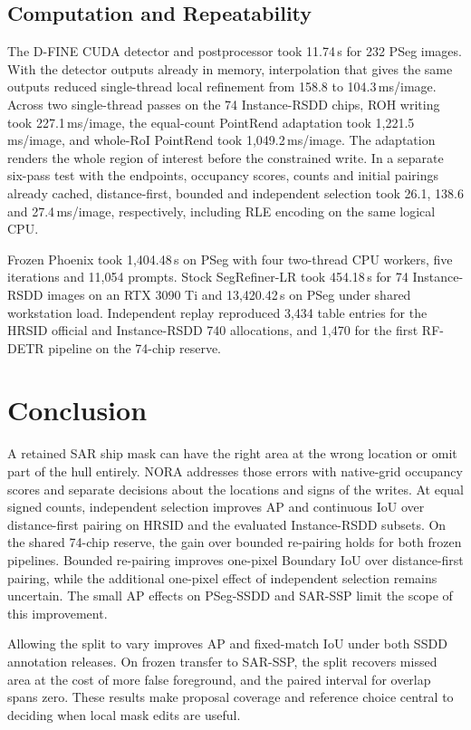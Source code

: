 \documentclass[journal]{IEEEtran}
\begin{document}
\subsection{Computation and Repeatability}
The D-FINE CUDA detector and postprocessor took 11.74\,s for 232 PSeg images. With the detector outputs already in memory, interpolation that gives the same outputs reduced single-thread local refinement from 158.8 to 104.3\,ms/image. Across two single-thread passes on the 74 Instance-RSDD chips, ROH writing took 227.1\,ms/image, the equal-count PointRend adaptation took 1,221.5\,ms/image, and whole-RoI PointRend took 1,049.2\,ms/image. The adaptation renders the whole region of interest before the constrained write. In a separate six-pass test with the endpoints, occupancy scores, counts and initial pairings already cached, distance-first, bounded and independent selection took 26.1, 138.6 and 27.4\,ms/image, respectively, including RLE encoding on the same logical CPU.

Frozen Phoenix took 1,404.48\,s on PSeg with four two-thread CPU workers, five iterations and 11,054 prompts. Stock SegRefiner-LR took 454.18\,s for 74 Instance-RSDD images on an RTX 3090 Ti and 13,420.42\,s on PSeg under shared workstation load. Independent replay reproduced 3,434 table entries for the HRSID official and Instance-RSDD 740 allocations, and 1,470 for the first RF-DETR pipeline on the 74-chip reserve.

\section{Conclusion}
A retained SAR ship mask can have the right area at the wrong location or omit part of the hull entirely. NORA addresses those errors with native-grid occupancy scores and separate decisions about the locations and signs of the writes. At equal signed counts, independent selection improves AP and continuous IoU over distance-first pairing on HRSID and the evaluated Instance-RSDD subsets. On the shared 74-chip reserve, the gain over bounded re-pairing holds for both frozen pipelines. Bounded re-pairing improves one-pixel Boundary IoU over distance-first pairing, while the additional one-pixel effect of independent selection remains uncertain. The small AP effects on PSeg-SSDD and SAR-SSP limit the scope of this improvement.

Allowing the split to vary improves AP and fixed-match IoU under both SSDD annotation releases. On frozen transfer to SAR-SSP, the split recovers missed area at the cost of more false foreground, and the paired interval for overlap spans zero. These results make proposal coverage and reference choice central to deciding when local mask edits are useful.
\end{document}
